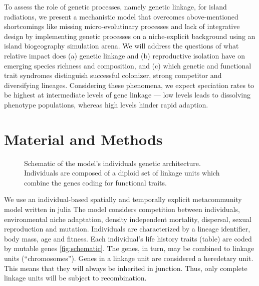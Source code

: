\documentclass[a4paper]{scrartcl}
\begin{document}


To assess the role of genetic processes, namely genetic linkage, for island radiations,
we present a mechanistic model that overcomes above-mentioned shortcomings like missing micro-evolutinary processes and lack of integrative design
by implementing genetic processes on a niche-explicit background
using an island biogeography simulation arena.
We will address the questions of what relative impact does (a) genetic linkage and
(b) reproductive isolation have on emerging species richness and composition,
and (c) which genetic and functional trait syndromes %
distinguish successful colonizer,
strong competitor and diversifying lineages.
Considering these phenomena, we expect speciation rates to be highest at intermediate levels of gene linkage --- low
levels leads to dissolving phenotype populations, whereas high levels hinder rapid adaption. %


\section{Material and Methods}

\begin{figure}
  \caption{Schematic of the model's individuals genetic architecture.
    Individuals are composed of a diploid set of linkage units which combine the genes coding for functional traits.}
  \label{schematic}
\end{figure}

We use an individual-based spatially and temporally explicit metacommunity model written in julia %
The model considers competition between individuals, environmental niche adaptation, density independent mortality,
dispersal, sexual reproduction and mutation.
Individuals are characterized by a lineage identifier,
body mass, age and fitness.
Each individual's life history traits (table) are coded by mutable genes \cref{fig:schematic}.
The genes, in turn, may be combined to linkage units (``chromosomes'').
Genes in a linkage unit are considered a heredetary unit.
This means that they will always be inherited in junction.
Thus, only complete linkage units will be subject to recombination.
\end{document}
